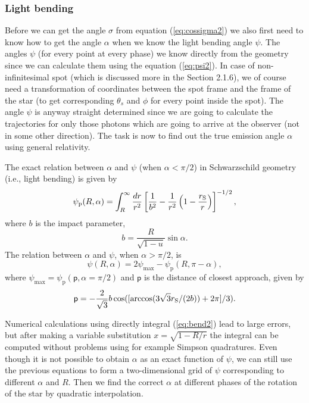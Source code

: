 \documentclass{wihuri}
\def\rg{r_{\rm S}} %
\def\be{\begin{equation}}
\def\ee{\end{equation}}
\def\rg{r_{\rm S}} %
\def\thetas{\theta_{s}}
\begin{document}
\subsubsection{Light bending}

Before we can get the angle $\sigma$ from equation (\ref{eq:cossigma2}) we also first need to know how to get the angle $\alpha$ when we know the light bending angle $\psi$. The angles $\psi$ (for every point at every phase) we know directly from the geometry since we can calculate them using the equation (\ref{eq:psi2}). In case of non-infinitesimal spot (which is discussed more in the Section 2.1.6), we of course need a  transformation of coordinates between the spot frame and the frame of the star (to get corresponding $\thetas$ and $\phi$ for every point inside the spot). The angle $\psi$ is anyway straight determined since we are going to calculate the trajectories for only those photons which are going to arrive at the observer (not in some other direction). The task is now to find out the true emission angle $\alpha$ using general relativity. 

The exact relation between $\alpha$ and $\psi$ (when $\alpha < \pi/2$) in Schwarzschild geometry (i.e., light bending) is given by \cite{mtw}%
\be \label{eq:bend2}
  \psi_{\mathrm{p}}(R,\alpha)=\int_R^{\infty} \frac{dr}{r^2} \left[ \frac{1}{b^2} -
       \frac{1}{r^2}\left( 1- \frac{\rg}{r}\right)\right]^{-1/2} ,
\ee
where $b$ is the impact parameter,
\be \label{eq:impact2}
  b=\frac{R}{\sqrt{1-u}} \sin\alpha .
\ee
The relation between  $\alpha$ and $\psi$, when $\alpha > \pi/2$, is 
\be 
\psi(R,\alpha)=2\psi_{\max}-\psi_{\mathrm{p}}(R,\pi-\alpha),
\ee 
where $\psi_{\max} = \psi_{\mathrm{p}}(\mathsf{p},\alpha=\pi/2)$ and $\mathsf{p}$ is the distance of closest approach, given by
\be
\mathsf{p} = -\frac{2}{\sqrt{3}}b\cos([\arccos(3\sqrt{3}\rg/(2b))+2\pi]/3).
\ee


Numerical calculations using directly integral (\ref{eq:bend2}) lead to large errors, but after making a variable substitution $x = \sqrt{1-R/r}$ the integral can be computed without problems using for example Simpson quadratures. Even though it is not possible to obtain $\alpha$ as an exact function of $\psi$, we can still use the previous equations to form a two-dimensional grid of $\psi$ corresponding to different $\alpha$ and $R$. Then we find the correct $\alpha$ at different phases of the rotation of the star by quadratic interpolation. 
\end{document}
